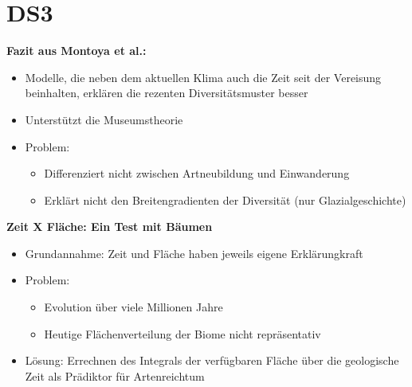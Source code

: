 \section{DS3}
\textbf{Fazit aus Montoya et al.:}
\begin{itemize}
	\item Modelle, die neben dem aktuellen Klima auch die Zeit seit der Vereisung beinhalten, erklären die rezenten Diversitätsmuster besser
	\item Unterstützt die Museumstheorie
	\item Problem:
	\begin{itemize}
		\item Differenziert nicht zwischen Artneubildung und Einwanderung
		\item Erklärt nicht den Breitengradienten der Diversität (nur Glazialgeschichte)
	\end{itemize}
\end{itemize}

\textbf{Zeit X Fläche: Ein Test mit Bäumen}
\begin{itemize}
	\item Grundannahme: Zeit und Fläche haben jeweils eigene Erklärungkraft
	\item Problem:
	\begin{itemize}
		\item Evolution über viele Millionen Jahre
		\item Heutige Flächenverteilung der Biome nicht repräsentativ
	\end{itemize}
	\item Lösung: Errechnen des Integrals der verfügbaren Fläche über die geologische Zeit als Prädiktor für Artenreichtum
\end{itemize}

